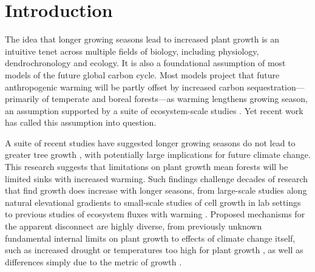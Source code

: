 \documentclass[11pt]{article}
\begin{document}

\section*{Introduction}

The idea that longer growing seasons lead to increased plant growth is an intuitive tenet across multiple fields of biology, including physiology, dendrochronology and ecology. It is also a foundational assumption of most models of the future global carbon cycle. Most models project that future anthropogenic warming will be partly offset by increased carbon sequestration---primarily of temperate and boreal forests---as warming lengthens growing season, an assumption supported by a suite of ecosystem-scale studies \citep{finzi2020,keenan2014net}. Yet recent work has called this assumption into question.

A suite of recent studies have suggested longer growing seasons do not lead to greater tree growth \citep{dow2022warm,green2022limits,silvestro2023longer}, with potentially large implications for future climate change. This research suggests that limitations on plant growth mean forests will be limited sinks with increased warming. Such findings challenge decades of research that find growth does increase with longer seasons, from large-scale studies along natural elevational gradients to small-scale studies of cell growth in lab settings to previous studies of ecosystem fluxes with warming \citep{finzi2020,keenan2014net}. Proposed mechanisms for the apparent disconnect are highly diverse, from previously unknown fundamental internal limits on plant growth \citep{zohner2023effect} to effects of climate change itself, such as increased drought or temperatures too high for plant growth \citep{dow2022warm}, as well as differences simply due to the metric of growth \citep{green2022limits}.
\end{document}
